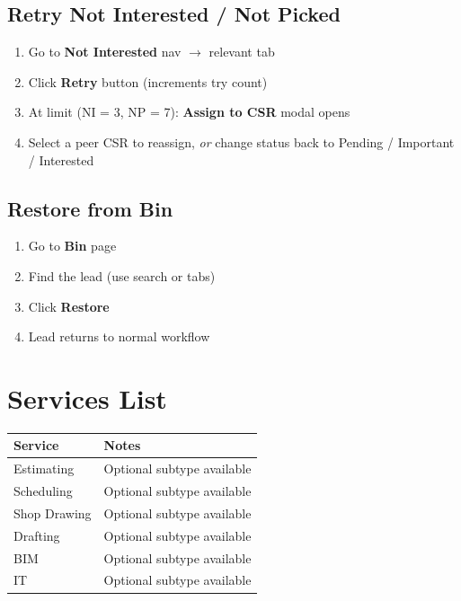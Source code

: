 \documentclass[11pt,a4paper]{article}
\begin{document}
\subsection{Retry Not Interested / Not Picked}

\begin{workflowbox}
\begin{enumerate}
    \item Go to \textbf{Not Interested} nav $\rightarrow$ relevant tab
    \item Click \textbf{Retry} button (increments try count)
    \item At limit (NI = 3, NP = 7): \textbf{Assign to CSR} modal opens
    \item Select a peer CSR to reassign, \textit{or} change status back to Pending / Important / Interested
\end{enumerate}
\end{workflowbox}

\subsection{Restore from Bin}

\begin{workflowbox}
\begin{enumerate}
    \item Go to \textbf{Bin} page
    \item Find the lead (use search or tabs)
    \item Click \textbf{Restore}
    \item Lead returns to normal workflow
\end{enumerate}
\end{workflowbox}

\section{Services List}

\begin{longtable}{@{}p{4cm}p{10cm}@{}}
\toprule
\textbf{Service} & \textbf{Notes} \\
\midrule
Estimating      & Optional subtype available \\
Scheduling      & Optional subtype available \\
Shop Drawing    & Optional subtype available \\
Drafting        & Optional subtype available \\
BIM             & Optional subtype available \\
IT              & Optional subtype available \\
\bottomrule
\end{longtable}
\end{document}
